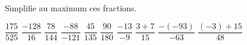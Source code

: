 %
%
Simplifie au maximum ces fractions.
  \begin{tasks}
    \task $\dfrac{175}{525}$
    \task $\dfrac{- 128}{16}$
    \task $\dfrac{78}{144}$
    \task $\dfrac{- 88}{- 121}$
    \task $\dfrac{45}{135}$
    \task $\dfrac{90}{180}$
    \task $\dfrac{- 13}{- 9}$
    \task $\dfrac{3 + 7}{15}$
    \task $\dfrac{- ( - 93)}{- 63}$
    \task $\dfrac{( - 3) + 15}{48}$
  \end{tasks}
